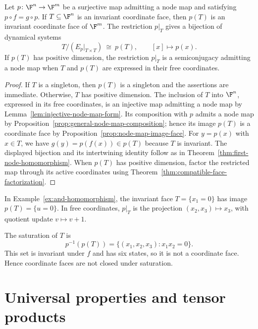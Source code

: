 \begin{proposition}\label{prop:invariant-face-quotient}
Let $p\colon\F^n\to\F^m$ be a surjective map admitting a node map and satisfying $p\circ f=g\circ p$. If $T\subseteq\F^n$ is an invariant coordinate face, then $p(T)$ is an invariant coordinate face of $\F^m$. The restriction $p|_T$ gives a bijection of dynamical systems
\[
    T/(E_p|_{T\times T})\ \cong\ p(T),
    \qquad [x]\longmapsto p(x).
\]
If $p(T)$ has positive dimension, the restriction $p|_T$ is a semiconjugacy admitting a node map when $T$ and $p(T)$ are expressed in their free coordinates.
\end{proposition}

\begin{proof}
If $T$ is a singleton, then $p(T)$ is a singleton and the assertions are immediate. Otherwise, $T$ has positive dimension.
The inclusion of $T$ into $\F^n$, expressed in its free coordinates, is an injective map admitting a node map by Lemma~\ref{lem:injective-node-map-form}. Its composition with $p$ admits a node map by Proposition~\ref{prop:general-node-map-composition}; hence its image $p(T)$ is a coordinate face by Proposition~\ref{prop:node-map-image-face}. For $y=p(x)$ with $x\in T$, we have $g(y)=p(f(x))\in p(T)$ because $T$ is invariant. The displayed bijection and its intertwining identity follow as in Theorem~\ref{thm:first-node-homomorphism}. When $p(T)$ has positive dimension, factor the restricted map through its active coordinates using Theorem~\ref{thm:compatible-face-factorization}.
\end{proof}

\begin{example}\label{ex:invariant-face-saturation}
In Example~\ref{ex:and-homomorphism}, the invariant face $T=\{x_1=0\}$ has image $p(T)=\{u=0\}$. In free coordinates, $p|_T$ is the projection $(x_2,x_3)\mapsto x_3$, with quotient update $v\mapsto v+1$.

The saturation of $T$ is
\[
    p^{-1}(p(T))=\{(x_1,x_2,x_3):x_1x_2=0\}.
\]
This set is invariant under $f$ and has six states, so it is not a coordinate face. Hence coordinate faces are not closed under saturation.
\end{example}


\section{Universal properties and tensor products}\label{sec:factorization-tensor}

